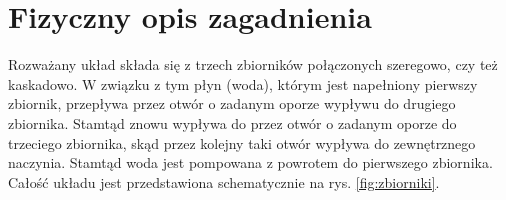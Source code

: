 \chapter{Fizyczny opis zagadnienia}
\label{cha:model}

\newtheorem{torricelli}{Prawo Torricellego}[chapter]
\newtheorem{mass}{Prawo zachowania masy}[chapter]

Rozważany układ składa się z trzech zbiorników połączonych szeregowo, czy też kaskadowo.
W związku z tym płyn (woda), którym jest napełniony pierwszy zbiornik, przepływa przez otwór o zadanym oporze wypływu do drugiego zbiornika.
Stamtąd znowu wypływa do przez otwór o zadanym oporze do trzeciego zbiornika, skąd przez kolejny taki otwór wypływa do zewnętrznego naczynia.
Stamtąd woda jest pompowana z powrotem do pierwszego zbiornika.
Całość układu jest przedstawiona schematycznie na rys. \ref{fig:zbiorniki}.


